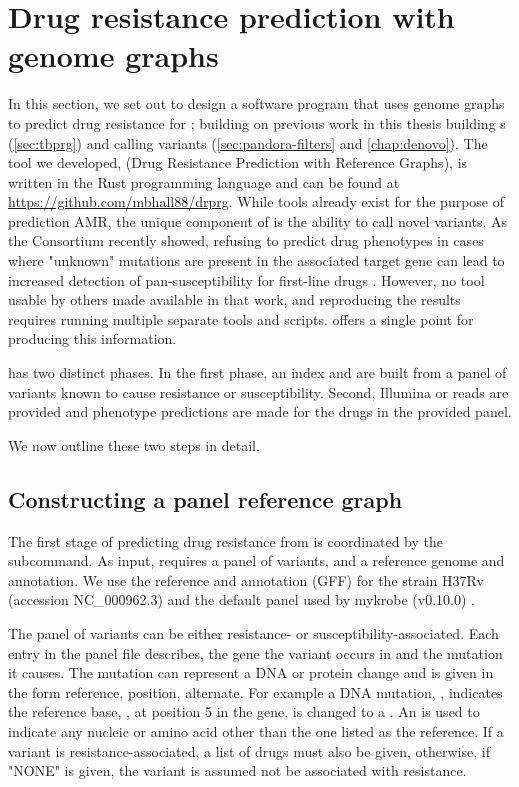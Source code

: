 \section{Drug resistance prediction with genome graphs}
\label{sec:drprg-methods}
In this section, we set out to design a software program that uses genome graphs to predict drug resistance for \mtb{}; building on previous work in this thesis building \mtb{} \prg{}s (\autoref{sec:tbprg}) and calling variants (\autoref{sec:pandora-filters} and \autoref{chap:denovo}). The tool we developed, \drprg{} (Drug Resistance Prediction with Reference Graphs), is written in the Rust programming language and can be found at \url{https://github.com/mbhall88/drprg}.
While tools already exist for the purpose of prediction AMR, the unique component of \drprg{} is the ability to call novel variants. As the \cryptic{} Consortium recently showed, refusing to predict drug phenotypes in cases where "unknown" mutations are present in the associated target gene can lead to increased detection of pan-susceptibility for first-line drugs \cite{cryptic2018}. However, no tool usable by others made available in that work, and reproducing the results requires running multiple separate tools and scripts. \drprg{} offers a single point for producing this information.

\drprg{} has two distinct phases. In the first phase, an index and \prg{} are built from a panel of variants known to cause resistance or susceptibility. Second, Illumina or \ont{} reads are provided and phenotype predictions are made for the drugs in the provided panel.

We now outline these two steps in detail.

\subsection{Constructing a panel reference graph}
\label{sec:drprg-index}
The first stage of predicting drug resistance from \drprg{} is coordinated by the  subcommand. As input,  requires a panel of variants, and a reference genome and annotation. We use the reference and annotation (GFF) for the \mtb{} strain H37Rv (accession NC\_000962.3) and the default panel used by mykrobe (v0.10.0) \cite{hunt2019}. 

The panel of variants can be either resistance- or susceptibility-associated. Each entry in the panel file describes, the gene the variant occurs in and the mutation it causes. The mutation can represent a DNA or protein change and is given in the form reference, position, alternate. For example a DNA mutation, , indicates the reference base, , at position 5 in the gene, is changed to a . An  is used to indicate any nucleic or amino acid other than the one listed as the reference. If a variant is resistance-associated, a list of drugs must also be given, otherwise, if "NONE" is given, the variant is assumed not be associated with resistance.

